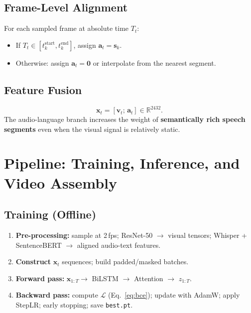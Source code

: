 \documentclass[10pt,conference]{IEEEtran}
\begin{document}
\subsection{Frame-Level Alignment}

For each sampled frame at absolute time $T_t$:
\begin{itemize}
  \item If $T_t \in [t_k^{\mathrm{start}}, t_k^{\mathrm{end}}]$, assign
        $\mathbf{a}_t = \mathbf{s}_k$.
  \item Otherwise: assign $\mathbf{a}_t = \mathbf{0}$ or interpolate from
        the nearest segment.
\end{itemize}

\subsection{Feature Fusion}

\begin{equation}
  \mathbf{x}_t = [\mathbf{v}_t;\, \mathbf{a}_t] \in \mathbb{R}^{2432}.
\end{equation}
The audio-language branch increases the weight of \textbf{semantically rich
speech segments} even when the visual signal is relatively static.

\section{Pipeline: Training, Inference, and Video Assembly}

\subsection{Training (Offline)}

\begin{enumerate}
  \item \textbf{Pre-processing:} sample at 2\,fps; ResNet-50 $\to$ visual
        tensors; Whisper + SentenceBERT $\to$ aligned audio-text features.
  \item \textbf{Construct} $\mathbf{x}_t$ sequences; build padded/masked
        batches.
  \item \textbf{Forward pass:} $\mathbf{x}_{1:T} \to$ BiLSTM $\to$ Attention
        $\to$ $z_{1:T}$.
  \item \textbf{Backward pass:} compute $\mathcal{L}$ (Eq.~\ref{eq:bce});
        update with AdamW; apply StepLR; early stopping; save
        \texttt{best.pt}.
\end{enumerate}
\end{document}
